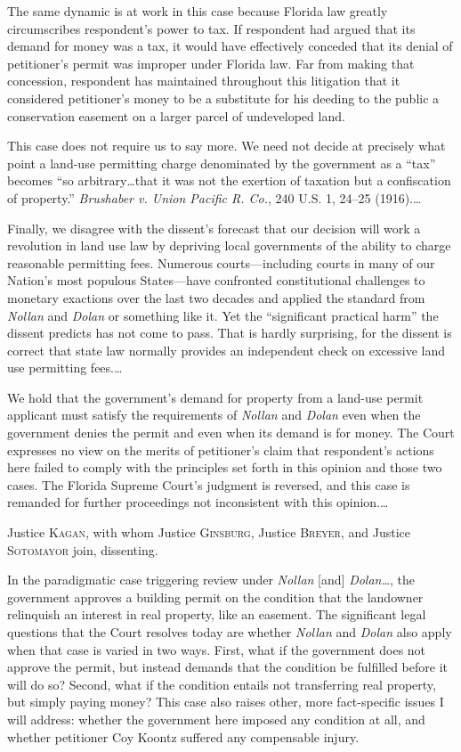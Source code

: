The same dynamic is at work in this case because Florida law greatly
circumscribes respondent's power to tax. If respondent had argued that its
demand for money was a tax, it would have effectively conceded that its denial
of petitioner's permit was improper under Florida law. Far from making that
concession, respondent has maintained throughout this litigation that it
considered petitioner's money to be a substitute for his deeding to the public a
conservation easement on a larger parcel of undeveloped land.

This case does not require us to say more. We need not decide at precisely what
point a land-use permitting charge denominated by the government as a ``tax''
becomes ``so arbitrary\ldots that it was not the exertion of taxation but a
confiscation of property.'' \textit{Brushaber v. Union Pacific R. Co.}, 240 U.S.
1, 24--25 (1916).\ldots



Finally, we disagree with the dissent's forecast that our decision will work a
revolution in land use law by depriving local governments of the ability to
charge reasonable permitting fees. Numerous courts---including courts in many of
our Nation's most populous States---have confronted constitutional challenges to
monetary exactions over the last two decades and applied the standard from
\textit{Nollan} and \textit{Dolan} or something like it. Yet the ``significant
practical harm'' the dissent predicts has not come to pass. That is hardly
surprising, for the dissent is correct that state law normally provides an
independent check on excessive land use permitting fees.\ldots

We hold that the government's demand for property from a land-use permit
applicant must satisfy the requirements of \textit{Nollan} and \textit{Dolan}
even when the government denies the permit and even when its demand is for
money. The Court expresses no view on the merits of petitioner's claim that
respondent's actions here failed to comply with the principles set forth in this
opinion and those two cases. The Florida Supreme Court's judgment is reversed,
and this case is remanded for further proceedings not inconsistent with this
opinion.\ldots

\opinion Justice \textsc{Kagan}, with whom Justice \textsc{Ginsburg}, Justice
\textsc{Breyer}, and Justice \textsc{Sotomayor} join, dissenting.

In the paradigmatic case triggering review under \textit{Nollan} [and]
\textit{Dolan\ldots }, the government approves a building permit on the
condition that the landowner relinquish an interest in real property, like an
easement. The significant legal questions that the Court resolves today are
whether \textit{Nollan} and \textit{Dolan} also apply when that case is varied
in two ways. First, what if the government does not approve the permit, but
instead demands that the condition be fulfilled before it will do so? Second,
what if the condition entails not transferring real property, but simply paying
money? This case also raises other, more fact-specific issues I will address:
whether the government here imposed any condition at all, and whether petitioner
Coy Koontz suffered any compensable injury.

